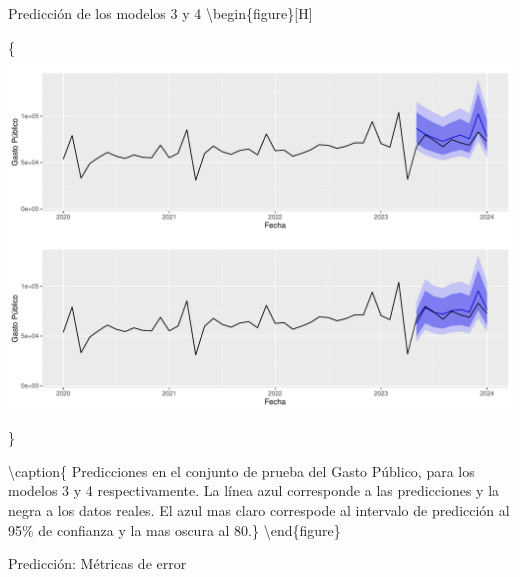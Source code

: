 \documentclass[
  ignorenonframetext,
]{beamer}
\begin{document}
\begin{frame}{Predicción de los modelos 3 y 4}
\protect\hypertarget{predicciuxf3n-de-los-modelos-3-y-4}{}
\textbackslash begin\{figure\}{[}H{]}

\{\centering \includegraphics[width=0.95\linewidth]{presentacion_files/figure-beamer/unnamed-chunk-24-1}

\}

\textbackslash caption\{\label{pred34} Predicciones en el conjunto de
prueba del Gasto Público, para los modelos 3 y 4 respectivamente. La
línea azul corresponde a las predicciones y la negra a los datos reales.
El azul mas claro correspode al intervalo de predicción al 95\% de
confianza y la mas oscura al 80.\}\label{fig:unnamed-chunk-24}
\textbackslash end\{figure\}
\end{frame}

\begin{frame}{Predicción: Métricas de error}
\protect\hypertarget{predicciuxf3n-muxe9tricas-de-error}{}
\begin{table}[H]
\centering
{}
\caption{Resultados de error de predicción para los diferentes modelos.}
\label{tab:metricas}
\end{table}
\end{frame}
\end{document}
